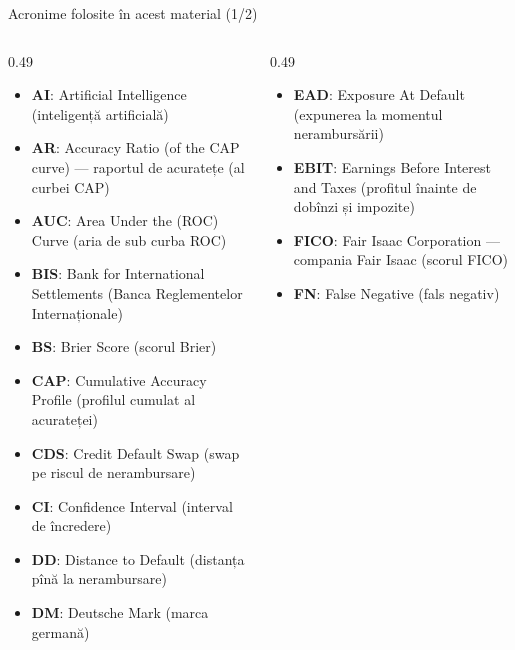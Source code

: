 
{
\begin{frame}[noframenumbering]
    \titlepage
\end{frame}
}
\begin{frame}{Acronime folosite în acest material (1/2)}
\begin{columns}[T]
\begin{column}{0.49\textwidth}
\begin{itemize}\setlength{\itemsep}{0pt}
    \item \textbf{AI}: Artificial Intelligence (inteligență artificială)
    \item \textbf{AR}: Accuracy Ratio (of the CAP curve) — raportul de acuratețe (al curbei CAP)
    \item \textbf{AUC}: Area Under the (ROC) Curve (aria de sub curba ROC)
    \item \textbf{BIS}: Bank for International Settlements (Banca Reglementelor Internaționale)
    \item \textbf{BS}: Brier Score (scorul Brier)
    \item \textbf{CAP}: Cumulative Accuracy Profile (profilul cumulat al acurateței)
    \item \textbf{CDS}: Credit Default Swap (swap pe riscul de nerambursare)
    \item \textbf{CI}: Confidence Interval (interval de încredere)
    \item \textbf{DD}: Distance to Default (distanța pînă la nerambursare)
    \item \textbf{DM}: Deutsche Mark (marca germană)
\end{itemize}
\end{column}
\begin{column}{0.49\textwidth}
\begin{itemize}\setlength{\itemsep}{0pt}
    \item \textbf{EAD}: Exposure At Default (expunerea la momentul nerambursării)
    \item \textbf{EBIT}: Earnings Before Interest and Taxes (profitul înainte de dobînzi și impozite)
    \item \textbf{FICO}: Fair Isaac Corporation — compania Fair Isaac (scorul FICO)
    \item \textbf{FN}: False Negative (fals negativ)

\end{itemize}
\end{column}
\end{columns}
\end{frame}
